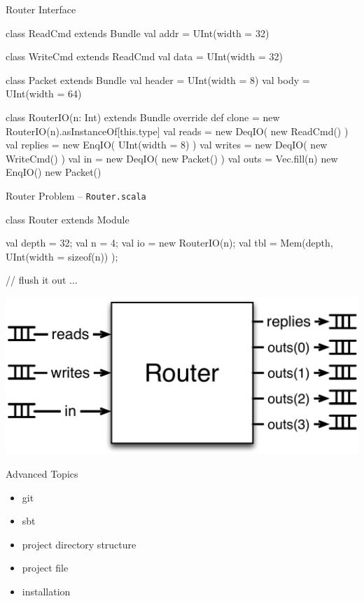 \documentclass[xcolor=pdflatex,dvipsnames,table]{beamer}
\begin{document}
\begin{frame}[fragile]{Router Interface}

{
\begin{scala}
class ReadCmd extends Bundle {
  val addr = UInt(width = 32)
}

class WriteCmd extends ReadCmd {
  val data = UInt(width = 32)
}

class Packet extends Bundle {
  val header = UInt(width = 8)
  val body   = UInt(width = 64)
}

class RouterIO(n: Int) extends Bundle {
  override def clone = new RouterIO(n).asInstanceOf[this.type]
  val reads   = new DeqIO( new ReadCmd() )
  val replies = new EnqIO( UInt(width = 8) )
  val writes  = new DeqIO( new WriteCmd() )
  val in      = new DeqIO( new Packet() )
  val outs    = Vec.fill(n){ new EnqIO(){ new Packet() } }
}
\end{scala}
}

\end{frame}

\begin{frame}[fragile]{Router Problem -- \tt Router.scala}
\begin{scala}
class Router extends Module {
  val depth = 32;
  val n     = 4;
  val io    = new RouterIO(n);
  val tbl   = Mem(depth, UInt(width = sizeof(n)) );
  
  // flush it out ...
}
\end{scala}
\begin{center}
\includegraphics[height=0.45\textheight]{figs/trouter.pdf} 
\end{center}
\end{frame}

\begin{frame}[fragile]{Advanced Topics}

\begin{itemize}
\item git
\item sbt
\item project directory structure
\item project file
\item installation
\end{itemize}

\end{frame}
\end{document}
